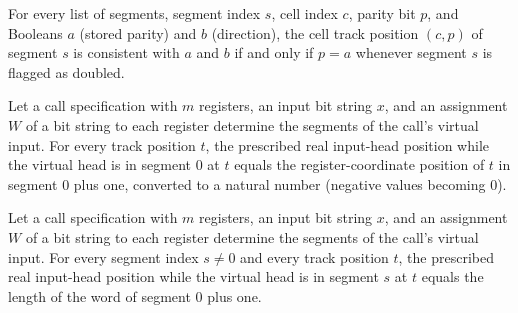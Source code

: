 \begin{lemma}
\label{Complexity.LogProg.consistent_cell_iff}
\leanok
{}
For every list of segments, segment index $s$, cell index $c$, parity bit $p$, and
Booleans $a$ (stored parity) and $b$ (direction), the cell track position $(c,p)$ of
segment $s$ is consistent with $a$ and $b$ if and only if $p=a$ whenever segment $s$ is
flagged as doubled.
\end{lemma}

\begin{lemma}
\label{Complexity.LogProg.inPos_zero}
\leanok
{}
Let a call specification with $m$ registers, an input bit string $x$, and an assignment
$W$ of a bit string to each register determine the segments of the call's virtual input.
For every track position $t$, the prescribed real input-head position while the virtual
head is in segment $0$ at $t$ equals the register-coordinate position of $t$ in segment
$0$ plus one, converted to a natural number (negative values becoming $0$).
\end{lemma}

\begin{lemma}
\label{Complexity.LogProg.inPos_of_ne_zero}
\leanok
{}
Let a call specification with $m$ registers, an input bit string $x$, and an assignment
$W$ of a bit string to each register determine the segments of the call's virtual input.
For every segment index $s\neq 0$ and every track position $t$, the prescribed real
input-head position while the virtual head is in segment $s$ at $t$ equals the length of
the word of segment $0$ plus one.
\end{lemma}

